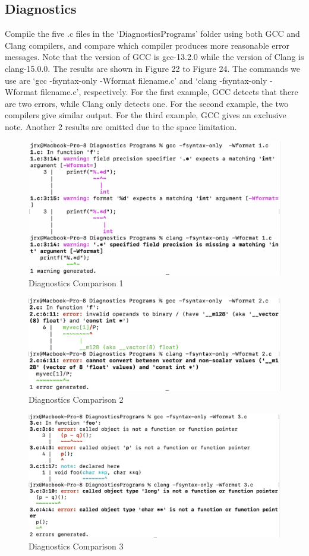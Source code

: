 \documentclass[conference]{IEEEtran}
\begin{document}
\subsection{Diagnostics}

Compile the five .c files\cite{b15} in the `DiagnosticsPrograms' folder using both GCC and Clang compilers, and compare which compiler produces more reasonable error messages. Note that the version of GCC is gcc-13.2.0 while the version of Clang is clang-15.0.0. The results are shown in Figure 22 to Figure 24. The commands we use are `gcc -fsyntax-only -Wformat filename.c' and `clang -fsyntax-only -Wformat filename.c', respectively. For the first example, GCC detects that there are two errors, while Clang only detects one. For the second example, the two compilers give similar output. For the third example, GCC gives an exclusive note. Another 2 results are omitted due to the space limitation.

\begin{figure}[htbp]
\centering
\includegraphics [width=0.8\linewidth]{Pictures/1.png}
\caption{Diagnostics Comparison 1}
\label{fig22}
\end{figure}

\begin{figure}[htbp]
\centering
\includegraphics [width=0.8\linewidth]{Pictures/2.png}
\caption{Diagnostics Comparison 2}
\label{fig23}
\end{figure}

\begin{figure}[htbp]
\centering
\includegraphics [width=0.8\linewidth]{Pictures/3.png}
\caption{Diagnostics Comparison 3}
\label{fig24}
\end{figure}
\end{document}
